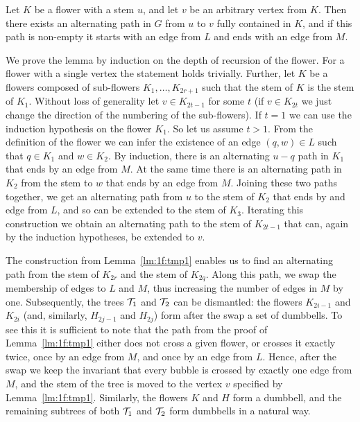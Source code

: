 \begin{lema}
  \label{lm:1f:tmp1}
  Let $K$ be a flower with a stem  $u$, and let $v$ be an arbitrary vertex from $K$. Then there
  exists an alternating path in $G$ from $u$ to $v$ fully contained in $K$, and if this path is
  non-empty it starts with an edge from $L$ and ends with an edge from $M$.
\end{lema}


\begin{dokaz}
  We prove the lemma by induction on the depth of recursion of the flower. For a flower with a single
  vertex the statement holds trivially. Further, let $K$ be a flowers composed of sub-flowers
  $K_1,\ldots,K_{2r+1}$ such that the stem of $K$ is the stem of $K_1$. Without loss of generality
  let $v\in K_{2t-1}$ for some $t$ (if $v\in K_{2t}$ we just change the direction of the
  numbering of the sub-flowers). If $t=1$ we can use the induction hypothesis on the flower $K_1$.
  So let us assume $t>1$. From the definition of the flower we can infer the existence of an edge
  $(q,w)\in L$ such that $q\in K_1$ and $w\in K_2$. By induction, there is an alternating $u-q$ path in $K_1$
  that ends by an edge from $M$. At the same time there is an alternating path
  in $K_2$ from the stem to $w$ that ends by an edge from $M$. Joining these two paths together, we get
  an alternating path from $u$ to the stem of $K_2$ that ends by and edge from $L$, and so can be extended
  to the stem of $K_3$. Iterating this construction we obtain an alternating path to the stem of $K_{2t-1}$
  that can, again by the induction hypotheses, be extended to $v$. 
\end{dokaz}


\noindent
The construction from Lemma~\ref{lm:1f:tmp1} 
enables us to find an alternating path from the stem of $K_{2r}$ and the stem of $K_{2q}$. Along this path, 
we swap the membership of edges to $L$ and $M$, thus increasing the number of edges in $M$ by one. Subsequently,
the trees ${\cal T}_1$ and ${\cal T}_2$ can be dismantled: the flowers $K_{2i-1}$ and $K_{2i}$ (and, similarly,
$H_{2j-1}$ and $H_{2j}$) form after the swap a set of dumbbells. To see this it is sufficient to note that
the path from the proof of Lemma~\ref{lm:1f:tmp1} either does not cross a given flower, or crosses it 
exactly twice, once by an edge from $M$, and once by an edge from $L$. Hence, after the swap we keep the invariant
that every bubble is crossed by exactly one edge from $M$, and the stem of the tree is moved to the vertex $v$ 
specified by Lemma~\ref{lm:1f:tmp1}. Similarly, the flowers $K$ and $H$ form a dumbbell, and the 
remaining subtrees of both  ${\cal T}_1$ and ${\cal T}_2$ form dumbbells in a natural way.

